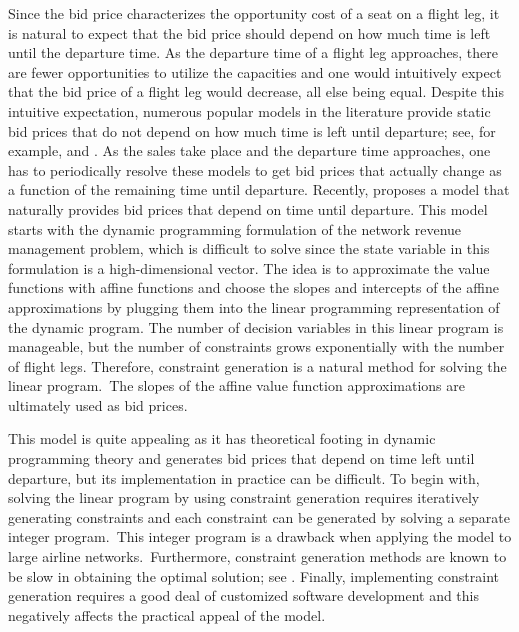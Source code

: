 Since the bid price characterizes the opportunity cost of a seat on a flight leg, it is natural to expect that the bid price should depend on how much time is left until the departure time. As the departure time of a flight leg approaches, there are fewer opportunities to utilize the capacities and one would intuitively expect that the bid price of a flight leg would decrease, all else being equal. Despite this intuitive expectation, numerous popular models in the literature provide static bid prices that do not depend on how much time is left until departure; see, for example,  and . As the sales take place and the departure time approaches, one  has to periodically resolve these models to get bid prices that actually change as a function of the remaining time until departure. Recently,  proposes a model that naturally provides bid prices that depend on time until departure. This model starts with the dynamic programming formulation of the network revenue management problem, which is difficult to solve since the state variable in this formulation is a high-dimensional vector. The idea is to approximate the value functions with affine functions and choose the slopes and intercepts of the affine approximations by plugging them into the linear programming representation of the dynamic program. The number of decision variables in this linear program is manageable, but the number of constraints grows exponentially with the number of flight legs. Therefore, constraint generation is a natural method for solving the linear program.~The slopes of the affine value function approximations are ultimately used as bid prices. 


This model is quite appealing as it has theoretical footing in dynamic programming theory and  generates bid prices that depend on time left until departure, but its implementation in practice can be difficult. To begin with, solving the linear program by using constraint generation requires iteratively generating constraints and each constraint can be generated by solving a separate integer program.~This integer program is a drawback when applying the model to large airline networks.~Furthermore, constraint generation methods are known to be slow in obtaining the optimal solution; see . Finally, implementing constraint generation requires a good deal of customized software development and this negatively affects the practical appeal of the model.


